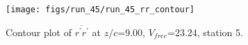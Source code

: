 \begin{figure}[H]
\centering
\texttt{[image: figs/run\_45/run\_45\_rr\_contour]}
\caption{Contour plot of $\overline{r^\prime r^\prime}$ at $z/c$=9.00, $V_{free}$=23.24, station 5.}
\label{fig:run_45_rr_contour}
\end{figure}



